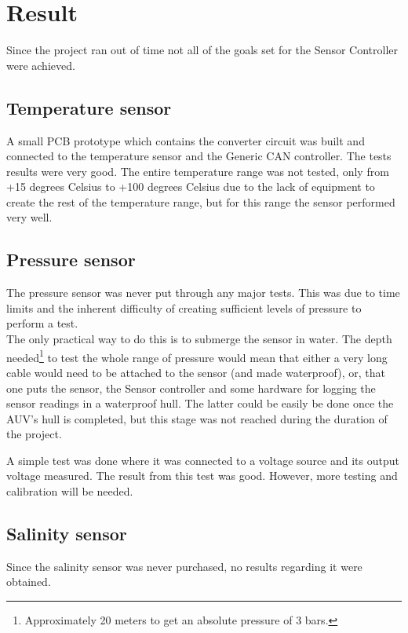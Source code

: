 
\section{Result}\label{sec:result}
Since the project ran out of time not all of the goals set for the Sensor Controller were achieved. 

\subsection{Temperature sensor}
A small PCB prototype which contains the converter circuit was built and connected to the temperature sensor and the Generic CAN controller. The tests results were very good. The entire temperature range was not tested, only from +15 degrees Celsius to +100 degrees Celsius due to the lack of equipment to create the rest of the temperature range, but for this range the sensor performed very well. 

\subsection{Pressure sensor}
The pressure sensor was never put through any major tests. This was due to time limits and the inherent difficulty of creating sufficient levels of pressure to perform a test. \\
The only practical way to do this is to submerge the sensor in water. The depth needed\footnote{Approximately 20 meters to get an absolute pressure of 3 bars.} to test the whole range of pressure would mean that either a very long cable would need to be attached to the sensor (and made waterproof), or, that one puts the sensor, the Sensor controller and some hardware for  logging the sensor readings in a waterproof hull. The latter could be easily be done once the AUV's hull is completed, but this stage was not reached during the duration of the project.

A simple test was done where it was connected to a voltage source and its output voltage measured. The result from this test was good. However, more testing and calibration will be needed.

\subsection{Salinity sensor}
Since the salinity sensor was never purchased, no results regarding it were obtained.


